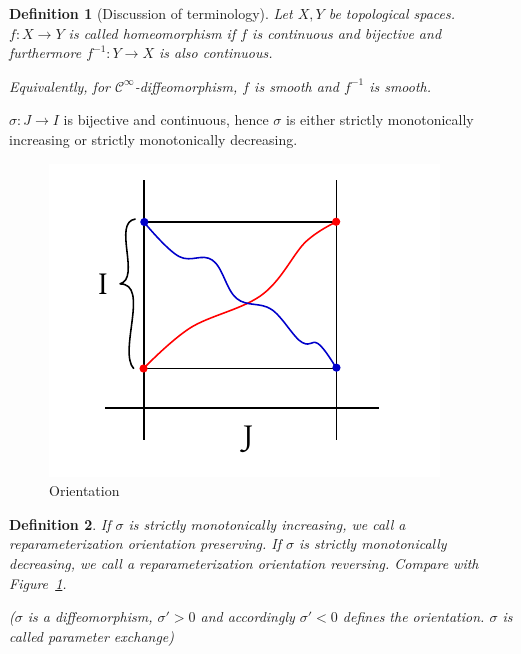 \documentclass{article}
\newtheorem{definition}{Definition}  \numberwithin{definition}{section}
\begin{document}
\begin{definition}[Discussion of terminology]
  Let $X, Y$ be topological spaces. $f: X \to Y$ is called \emph{homeomorphism}
  if $f$ is continuous and bijective and furthermore $f^{-1}: Y \to X$ is also continuous.

  Equivalently, for $\mathcal C^\infty$-diffeomorphism, $f$ is smooth and $f^{-1}$ is smooth.
\end{definition}

$\sigma: J \to I$ is bijective and continuous, hence $\sigma$ is either strictly monotonically increasing or strictly monotonically decreasing.

\begin{figure}[t]
  \begin{center}
    \includegraphics{img/41_orientation_preserving.pdf}
    \caption{Orientation}
    \label{img:orient}
  \end{center}
\end{figure}

\begin{definition}
  If $\sigma$ is strictly monotonically increasing, we call a reparameterization \emph{orientation preserving}.
  If $\sigma$ is strictly monotonically decreasing, we call a reparameterization \emph{orientation reversing}.
  Compare with Figure~\ref{img:orient}.

  ($\sigma$ is a diffeomorphism, $\sigma' > 0$ and accordingly $\sigma' < 0$ defines the orientation. $\sigma$ is called \emph{parameter exchange})
\end{definition}
\end{document}
